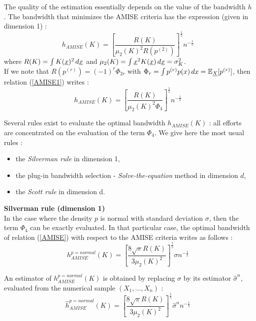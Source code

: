 {  The quality of the estimation essentially depends on the value of the bandwidth $h$. The bandwidth that minimizes the AMISE criteria  has the expression (given in dimension 1) :
  \begin{equation}
    \label{AMISE1}
    h_{AMISE}(K) = \displaystyle \left[ \frac{R(K)}{\mu_2(K)^2R(p^{(2)})}\right]^{\frac{1}{5}}n^{-\frac{1}{5}}
  \end{equation}
  where  $R(K) = \int K({\underline{x}})^2\, d{\underline{x}}$ and $\mu_2(K) = \int {\underline{x}}^2K({\underline{x}})\, d{\underline{x}} = \sigma_K^2$.\\
  If we note that $R(p^{(r)}) = (-1)^r\Phi_{2r}$ with $\Phi_r = \int p^{(r)}p(x)\, dx = \mathbb{E}_{\underline{X}}[p^{(r)}]$, then relation (\ref{AMISE1}) writes :
  \begin{equation}
    \label{AMISE}
    h_{AMISE}(K) = \displaystyle \left[ \frac{R(K)}{\mu_2(K)^2\Phi_4}\right]^{\frac{1}{5}}n^{-\frac{1}{5}}
  \end{equation}

  Several rules exist to  evaluate the optimal bandwidth $ h_{AMISE}(K)$ : all efforts are concentrated on the evaluation of the term $\Phi_4$. We give here the most usual rules :
  \begin{itemize}
  \item the \emph{Silverman rule} in dimension 1,
  \item the plug-in bandwidth selection - \emph{Solve-the-equation} method in dimension $d$,
  \item the \emph{Scott rule} in dimension d.
  \end{itemize}



  \vspace*{0.5cm}
  \textbf{Silverman rule (dimension 1)}\\

  In the case where the density $p$ is normal with standard deviation $\sigma$, then the term $\Phi_4$ can be exactly evaluated. In that particular case,  the optimal bandwidth of relation (\ref{AMISE}) with respect to the AMISE criteria writes as follows :
  \begin{equation}
    \label{pNormal}
    h^{p = normal}_{AMISE}(K) = \displaystyle \left[ \frac{8\sqrt{\pi} R(K)}{3\mu_2(K)^2}\right]^{\frac{1}{5}}\sigma n^{-\frac{1}{5}}
  \end{equation}

  An estimator of $h^{p= normal}_{AMISE}(K)$ is obtained by replacing $\sigma$ by its estimator $\hat{\sigma}^n$,  evaluated from the  numerical sample $(X_1, \dots, X_n)$ :
  \begin{equation}
    \label{Estimpnormal}
    \hat{h}^{p = normal}_{AMISE}(K) = \displaystyle \left[ \frac{8\sqrt{\pi} R(K)}{3\mu_2(K)^2}\right]^{\frac{1}{5}}\hat{\sigma}^n n^{-\frac{1}{5}}
  \end{equation}

}
